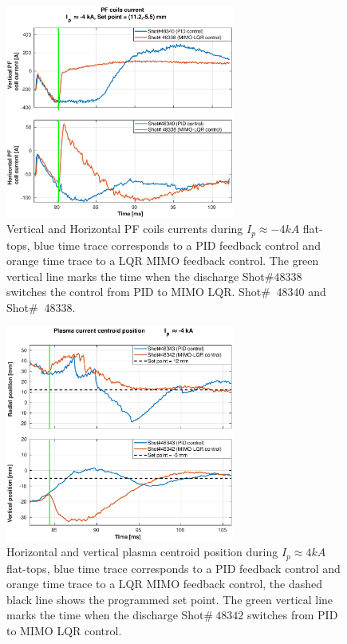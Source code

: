 \begin{figure}
	\centering
	\includegraphics[width=0.67\textwidth]{Chp5/PIDvsMIMO_340_338_curr_2.eps}
	\caption{ Vertical and Horizontal PF coils currents during  $I_p\approx -4kA$  flat-tops, blue time trace corresponds to a PID feedback control and orange time trace to a LQR MIMO feedback control. The green vertical line marks the time  when the  discharge Shot$\# 48338$ switches the control from PID to MIMO LQR. Shot$\#~$ 48340 and Shot$\#~$ 48338.}
\end{figure}

\begin{figure}
	\centering
	\includegraphics[width=0.67\textwidth]{Chp5/PIDvsMIMO_343_342_2.eps}
	\caption{Horizontal and vertical plasma centroid position during  $I_p\approx 4kA$  flat-tops, blue time trace corresponds to a PID feedback control and orange time trace to a LQR MIMO feedback control, the dashed black line shows the programmed set point. The green vertical line marks the time  when the  discharge Shot$\# ~48342$ switches  from PID to MIMO LQR control.}
\end{figure}

